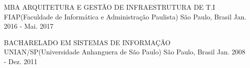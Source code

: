 

\begin{cventries}

  \cventry
    {MBA ARQUITETURA E GESTÃO DE INFRAESTRUTURA DE T.I} %
    {FIAP(Faculdade de Informática e Administração Paulista)} %
    {São Paulo, Brasil} %
    {Jan. 2016 - Mai. 2017} %
    {
      \begin{cvitems} %
      \end{cvitems}
    }
  
  \cventry
    {BACHARELADO EM SISTEMAS DE INFORMAÇÃO} %
    {UNIAN/SP(Universidade Anhanguera de São Paulo)} %
    {São Paulo, Brasil} %
    {Jan. 2008 - Dez. 2011} %
    {
      \begin{cvitems} %
      \end{cvitems}
    }

\end{cventries}
